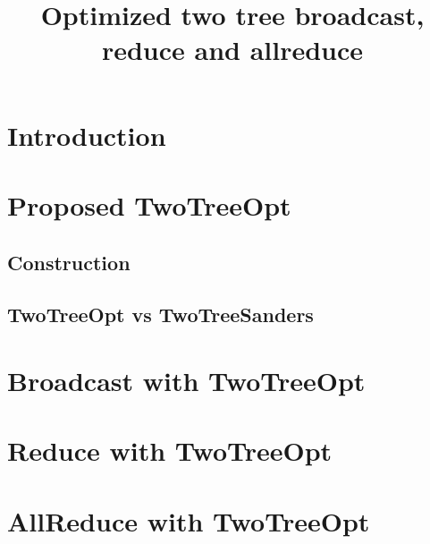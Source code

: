 \documentclass[sigconf]{acmart}
\renewcommand{\goal}[1]{}
\begin{document}
\title{Optimized two tree broadcast, reduce and allreduce}

%


\begin{abstract}

\end{abstract}

\maketitle

\section{Introduction}
\goal{Describe Collective communication and advantages of improving Two Tree algorithm}

\section{Proposed TwoTreeOpt}

\subsection{Construction}

\subsection{TwoTreeOpt vs TwoTreeSanders}

\section{Broadcast with TwoTreeOpt}

\section{Reduce with TwoTreeOpt}

\section{AllReduce with TwoTreeOpt}


 
\end{document}
